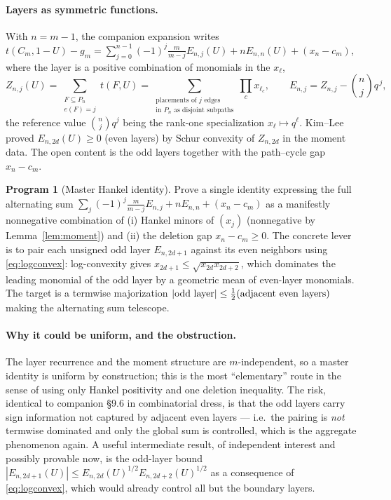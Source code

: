 \documentclass[11pt]{article}
\theoremstyle{definition}
\newtheorem{program}[theorem]{Program}
\newcommand{\1}{\mathbf{1}}
\begin{document}
\paragraph{Layers as symmetric functions.}
With $n=m-1$, the companion expansion writes
$t(C_m,1-U)-g_m=\sum_{j=0}^{n-1}(-1)^j\tfrac{m}{m-j}E_{n,j}(U)+nE_{n,n}(U)
+(x_n-c_m)$, where the layer is a positive combination of monomials in the
$x_\ell$,
\[
Z_{n,j}(U)=\!\!\sum_{\substack{F\subseteq P_n\\ e(F)=j}}\!\!t(F,U)
=\!\!\sum_{\substack{\text{placements of }j\text{ edges}\\ \text{in }P_n\text{ as disjoint subpaths}}}\!\!\prod_{c}x_{\ell_c},\qquad
E_{n,j}=Z_{n,j}-\binom nj q^{\,j},
\]
the reference value $\binom nj q^j$ being the rank-one specialization
$x_\ell\mapsto q^\ell$. Kim--Lee proved $E_{n,2d}(U)\ge0$ (even layers) by Schur
convexity of $Z_{n,2d}$ in the moment data. The open content is the odd layers
together with the path--cycle gap $x_n-c_m$.

\begin{program}[Master Hankel identity]\label{prog:schur}
Prove a single identity expressing the full alternating sum
$\sum_j(-1)^j\frac{m}{m-j}E_{n,j}+nE_{n,n}+(x_n-c_m)$ as a manifestly
nonnegative combination of (i) Hankel minors of $(x_j)$ (nonnegative by
Lemma~\ref{lem:moment}) and (ii) the deletion gap $x_n-c_m\ge0$. The concrete
lever is to pair each unsigned odd layer $E_{n,2d+1}$ against its even neighbors
using \eqref{eq:logconvex}: log-convexity gives
$x_{2d+1}\le\sqrt{x_{2d}x_{2d+2}}$, which dominates the leading monomial of the
odd layer by a geometric mean of even-layer monomials. The target is a
termwise majorization $|{\rm odd\ layer}|\le\tfrac12({\rm adjacent\ even\
layers})$ making the alternating sum telescope.
\end{program}

\paragraph{Why it could be uniform, and the obstruction.}
The layer recurrence and the moment structure are $m$-independent, so a master
identity is uniform by construction; this is the most ``elementary'' route in the
sense of using only Hankel positivity and one deletion inequality. The risk,
identical to companion \S9.6 in combinatorial dress, is that the odd layers carry
sign information not captured by adjacent even layers --- i.e.\ the pairing is
\emph{not} termwise dominated and only the global sum is controlled, which is the
aggregate phenomenon again. A useful intermediate result, of independent
interest and possibly provable now, is the odd-layer bound
$|E_{n,2d+1}(U)|\le E_{n,2d}(U)^{1/2}E_{n,2d+2}(U)^{1/2}$ as a consequence of
\eqref{eq:logconvex}, which would already control all but the boundary layers.
\end{document}
